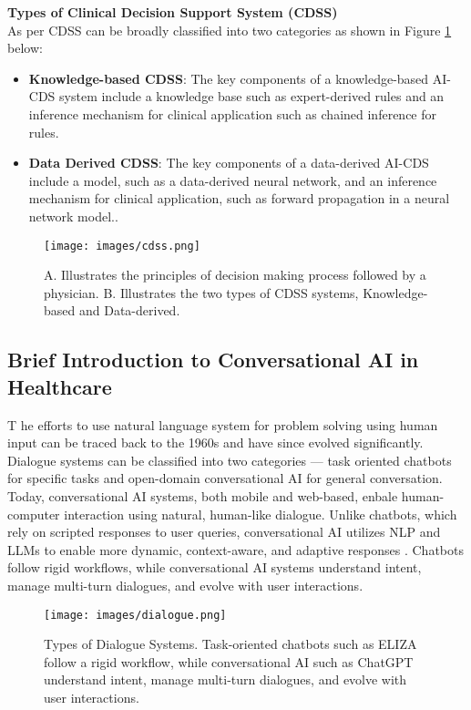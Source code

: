 \noindent \textcolor{TUMBlue}{\textbf{Types of Clinical Decision Support System (CDSS)}}\\
As per \cite{visweswaran2022integration} CDSS can be broadly classified into two categories as shown in Figure \ref{fig:cdss} below:
\begin{itemize}
    \item \textcolor{TUMRed}{\textbf{Knowledge-based CDSS}}: The key components of a knowledge-based AI-CDS system include a knowledge base such as expert-derived rules and an inference mechanism for clinical application such as chained inference for rules.
    \item \textcolor{TUMRed}{\textbf{Data Derived CDSS}}: The key components of a data-derived AI-CDS include a model, such as a data-derived neural network, and an inference mechanism for clinical application, such as forward propagation in a neural network model..
\end{itemize}
\begin{figure}[H]
    \centering
    \texttt{[image: images/cdss.png]}
    \caption{A. Illustrates the principles of decision making process followed by a physician. B. Illustrates the two types of CDSS systems, Knowledge-based and Data-derived.}
    \label{fig:cdss}
\end{figure}

\subsection{Brief Introduction to Conversational AI in Healthcare}
\lettrine{T}{ }he efforts to use natural language system for problem solving using human input can be traced back to the 1960s \cite{bobrow1964natural} and have since evolved significantly. Dialogue systems can be classified into two categories --- task oriented chatbots for specific tasks and open-domain conversational AI for general conversation. Today, conversational AI systems, both mobile and web-based, enbale human-computer interaction using natural, human-like dialogue. Unlike chatbots, which rely on scripted responses to user queries, conversational AI utilizes NLP and LLMs to enable more dynamic, context-aware, and adaptive responses \cite{jurafsky2000speech}. Chatbots follow rigid workflows, while conversational AI systems understand intent, manage multi-turn dialogues, and evolve with user interactions.
\begin{figure}[H]
    \centering
    \texttt{[image: images/dialogue.png]}
    \caption{Types of Dialogue Systems. Task-oriented chatbots such as ELIZA follow a rigid workflow, while conversational AI such as ChatGPT understand intent, manage multi-turn dialogues, and evolve with user interactions.}
    \label{fig:dialogue}
\end{figure}

